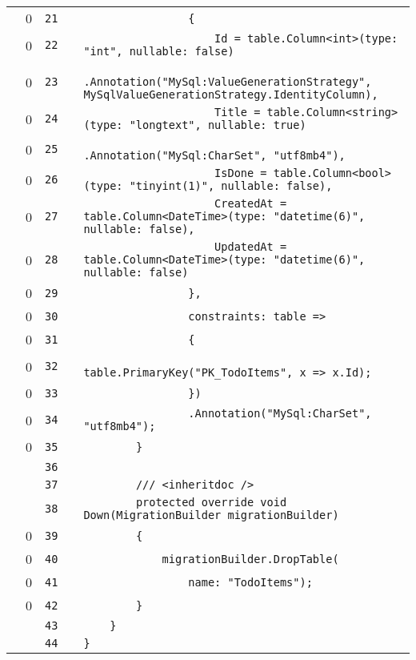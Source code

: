 \documentclass[a4paper,landscape,10pt]{article}
\begin{document}
\begin{longtable}[l]{lrrll}
\cellcolor{red} & 0 & \verb~21~ & & \verb~                {~\\
\cellcolor{red} & 0 & \verb~22~ & & \verb~                    Id = table.Column<int>(type: "int", nullable: false)~\\
\cellcolor{red} & 0 & \verb~23~ & & \verb~                        .Annotation("MySql:ValueGenerationStrategy", MySqlValueGenerationStrategy.IdentityColumn),~\\
\cellcolor{red} & 0 & \verb~24~ & & \verb~                    Title = table.Column<string>(type: "longtext", nullable: true)~\\
\cellcolor{red} & 0 & \verb~25~ & & \verb~                        .Annotation("MySql:CharSet", "utf8mb4"),~\\
\cellcolor{red} & 0 & \verb~26~ & & \verb~                    IsDone = table.Column<bool>(type: "tinyint(1)", nullable: false),~\\
\cellcolor{red} & 0 & \verb~27~ & & \verb~                    CreatedAt = table.Column<DateTime>(type: "datetime(6)", nullable: false),~\\
\cellcolor{red} & 0 & \verb~28~ & & \verb~                    UpdatedAt = table.Column<DateTime>(type: "datetime(6)", nullable: false)~\\
\cellcolor{red} & 0 & \verb~29~ & & \verb~                },~\\
\cellcolor{red} & 0 & \verb~30~ & & \verb~                constraints: table =>~\\
\cellcolor{red} & 0 & \verb~31~ & & \verb~                {~\\
\cellcolor{red} & 0 & \verb~32~ & & \verb~                    table.PrimaryKey("PK_TodoItems", x => x.Id);~\\
\cellcolor{red} & 0 & \verb~33~ & & \verb~                })~\\
\cellcolor{red} & 0 & \verb~34~ & & \verb~                .Annotation("MySql:CharSet", "utf8mb4");~\\
\cellcolor{red} & 0 & \verb~35~ & & \verb~        }~\\
\cellcolor{gray} &  & \verb~36~ & & \verb~~\\
\cellcolor{gray} &  & \verb~37~ & & \verb~        /// <inheritdoc />~\\
\cellcolor{gray} &  & \verb~38~ & & \verb~        protected override void Down(MigrationBuilder migrationBuilder)~\\
\cellcolor{red} & 0 & \verb~39~ & & \verb~        {~\\
\cellcolor{red} & 0 & \verb~40~ & & \verb~            migrationBuilder.DropTable(~\\
\cellcolor{red} & 0 & \verb~41~ & & \verb~                name: "TodoItems");~\\
\cellcolor{red} & 0 & \verb~42~ & & \verb~        }~\\
\cellcolor{gray} &  & \verb~43~ & & \verb~    }~\\
\cellcolor{gray} &  & \verb~44~ & & \verb~}~\\
\end{longtable}
\end{document}
